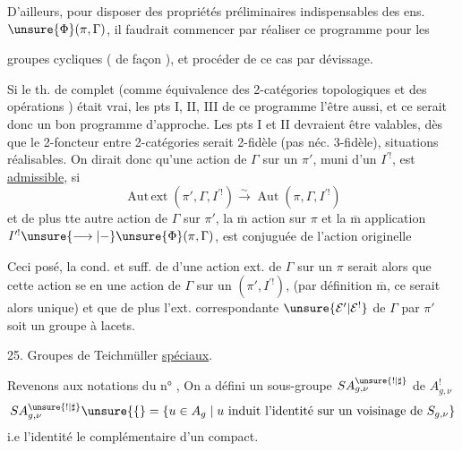 D'ailleurs, pour disposer des propriétés préliminaires indispensables des ens. $\unsure{\Phi}(\pi,\Gamma)$, il faudrait commencer par réaliser ce programme pour les


groupes cycliques ( de façon ), et procéder de ce cas par dévissage.

Si le th. de  complet (comme équivalence des 2-catégories  topologiques et des opérations ) était vrai, les pts I, II, III de ce programme  l'être aussi, et ce serait donc un bon programme d'approche. Les pts I et II devraient être valables, dès que le 2-foncteur entre 2-catégories serait 2-fidèle (pas néc.  3-fidèle),   situations réalisables. On dirait donc qu'une action  de $\Gamma$ sur un $\pi'$, muni d'un $I^{\prime !}$, est \uline{admissible}, si 
\[
\operatorname{Aut\,ext}(\pi',\Gamma,I^{\prime !})\xrightarrow{\sim}\operatorname{Aut}(\pi,\Gamma,I^{\prime !})
\]
et  de plus tte  autre action de $\Gamma$ sur $\pi'$,  la $\overline{\mathrm m}$ action sur $\pi$ et la $\overline{\mathrm m}$ application $I^{\prime !}\unsure{\longrightarrow|{-}}\unsure{\Phi}(\pi,\Gamma)$, est conjuguée de l'action originelle


Ceci posé, la cond.  et suff. de  d'une action ext.  de $\Gamma$ sur un $\pi$ serait alors que cette action se   en une action  de $\Gamma$ sur un $(\pi',I^{\prime !})$,  (par définition $\overline{\mathrm m}$, ce  serait  alors  unique) et que de plus l'ext. correspondante $\unsure{\mathcal E'|\mathcal E^{!}}$ de $\Gamma$ par $\pi'$ soit un groupe à lacets.

25. Groupes de Teichmüller \uline{spéciaux}.

Revenons aux notations du n° , On a défini un sous-groupe $SA_{g,\nu}^{\unsure{!|\sharp}}$ de $A_{g,\nu}^{!}$
\[
SA_{g,\nu}^{\unsure{!|\sharp}}\unsure{\{} =
\{u\in A_g\mid u\text{ induit l'identité sur un voisinage de }S_{g,\nu}\}
\]
i.e   l'identité  le complémentaire d'un compact.

